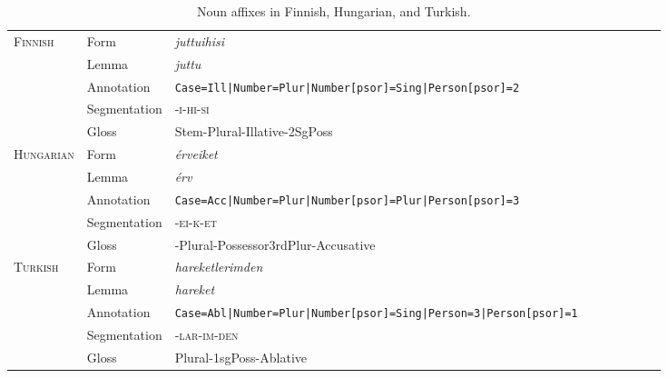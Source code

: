 \documentclass[11pt,letterpaper]{article}
\begin{document}
\begin{table}[]
    \centering
\begin{tabular}{lllllllll}
\multirow{5}{*}{\textsc{Finnish}} & Form & \textit{juttuihisi} \\
 & Lemma & \textit{juttu} \\
& Annotation & \texttt{Case=Ill|Number=Plur|Number[psor]=Sing|Person[psor]=2} \\
& Segmentation & -\textsc{i}-\textsc{hi}-\textsc{si} \\
& Gloss & Stem-Plural-Illative-2SgPoss \\
\hline
\multirow{5}{*}{\textsc{Hungarian}} & Form & \textit{érveiket} \\
& Lemma & \textit{érv}  \\
& Annotation &	\texttt{Case=Acc|Number=Plur|Number[psor]=Plur|Person[psor]=3} \\
& Segmentation & -\textsc{ei}-\textsc{k}-\textsc{et} \\
& Gloss & -Plural-Possessor3rdPlur-Accusative \\
\hline
\multirow{5}{*}{\textsc{Turkish}} & Form & \textit{hareketlerimden} \\
& Lemma & \textit{hareket} \\
& Annotation & 	\texttt{Case=Abl|Number=Plur|Number[psor]=Sing|Person=3|Person[psor]=1}	\\
& Segmentation & -\textsc{lar}-\textsc{im}-\textsc{den} \\
& Gloss & Plural-1sgPoss-Ablative\\
\end{tabular}
    \caption{Noun affixes in Finnish, Hungarian, and Turkish.}
    \label{tab:noun-affixes-examples}
\end{table}




\end{document}
